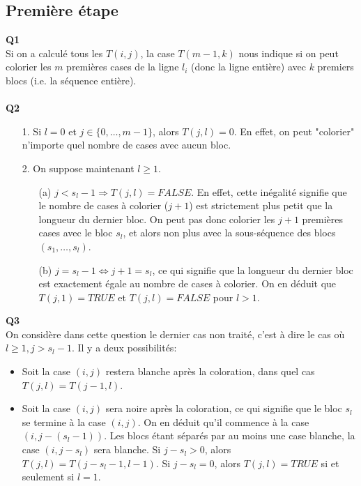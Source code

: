 \documentclass[10pt,a4paper]{article}
\begin{document}
\subsection{Première étape}
\noindent \textbf{Q1} \\
Si on a calculé tous les $T(i,j)$, la case $T(m-1, k)$ nous indique si on peut colorier les $m$ premières cases de la ligne $l_i$ (donc la ligne entière) avec $k$ premiers blocs (i.e. la séquence entière). \\ \\
\noindent \textbf{Q2}
\begin{itemize}
\item[1.] Si $l = 0$ et $j \in \lbrace 0, \hdots, m-1 \rbrace$, alors $T(j,l) = 0$. En effet, on peut "colorier" n'importe quel nombre de cases avec aucun bloc. \\ 
\item[2.] On suppose maintenant $l \geq 1$.
	\begin{itemize}
		\item[(a)] $j < s_l -1 \Rightarrow T(j,l) = FALSE$. En effet, cette inégalité signifie que le nombre de cases à colorier ($j+1$) est strictement plus petit que la longueur du dernier bloc. On peut pas donc colorier les $j+1$ premières cases avec le bloc $s_l$, et alors non plus avec la sous-séquence des blocs $(s_1, \hdots, s_l)$. 
		\item[(b)] $j = s_l -1 \Leftrightarrow j+1 = s_l$, ce qui signifie que la longueur du dernier bloc est exactement égale au nombre de cases à colorier. On en déduit que $T(j,1) = TRUE$ et $T(j,l) = FALSE$ pour $l > 1$. 
	\end{itemize}
\end{itemize}
\noindent
\textbf{Q3} \\
On considère dans cette question le dernier cas non traité, c'est à dire le cas où $l \geq 1, j > s_l -1$. Il y a deux possibilités: 
\begin{itemize}
	\item Soit la case $(i,j)$ restera blanche après la coloration, dans quel cas $T(j,l) = T(j-1,l)$. 
	\item Soit la case $(i,j)$ sera noire après la coloration, ce qui signifie que le bloc $s_l$ se termine à la case $(i,j)$. On en déduit qu'il commence à la case $(i, j - (s_l -1))$. Les blocs étant séparés par au moins une case blanche, la case $(i, j-s_l)$ sera blanche. Si $j-s_l > 0$, alors $T(j, l) = T(j-s_l -1, l-1)$. Si $j-s_l = 0$, alors $T(j,l) = TRUE$ si et seulement si $l = 1$.  
\end{itemize}  
\end{document}
